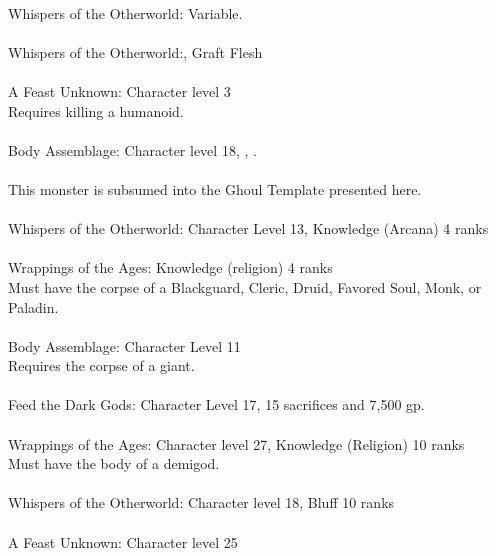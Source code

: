 \begin{multicols}{2}
\begin{small}
\\
Whispers of the Otherworld: Variable.\\
\\
Whispers of the Otherworld:, Graft Flesh\\
\\
A Feast Unknown: Character level 3\\
Requires killing a humanoid.\\
\\
Body Assemblage: Character level 18, , .\\
\\
This monster is subsumed into the Ghoul Template presented here.\\
\\
Whispers of the Otherworld: Character Level 13, Knowledge (Arcana) 4 ranks\\
\\
Wrappings of the Ages: Knowledge (religion) 4 ranks\\
Must have the corpse of a Blackguard, Cleric, Druid, Favored Soul, Monk, or Paladin.\\
\\
Body Assemblage: Character Level 11\\
Requires the corpse of a giant.\\
\\
Feed the Dark Gods: Character Level 17, 15 sacrifices and 7,500 gp.\\
\\
Wrappings of the Ages: Character level 27, Knowledge (Religion) 10 ranks\\
Must have the body of a demigod.\\
\\
Whispers of the Otherworld: Character level 18, Bluff 10 ranks\\
\\
A Feast Unknown: Character level 25\\

\end{small}
\end{multicols}
